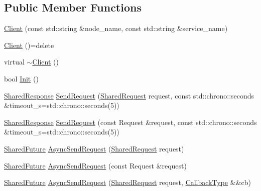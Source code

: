 \subsection*{Public Member Functions}
\begin{DoxyCompactItemize}
\item 
\hyperlink{classapollo_1_1cyber_1_1Client_a1ca1a0a5afa944750dded3726623534e}{Client} (const std\-::string \&node\-\_\-name, const std\-::string \&service\-\_\-name)
\item 
\hyperlink{classapollo_1_1cyber_1_1Client_a729e32c0d4f2dc7643f9cc5903a3166a}{Client} ()=delete
\item 
virtual \hyperlink{classapollo_1_1cyber_1_1Client_a6b08fc310fcf911beb0910da47e740d0}{$\sim$\-Client} ()
\item 
bool \hyperlink{classapollo_1_1cyber_1_1Client_af20d217d504b1e20a0d01015b4c97d74}{Init} ()
\item 
\hyperlink{classapollo_1_1cyber_1_1Client_af6198651a41ac3ed1b8c4c4bdb31bc71}{Shared\-Response} \hyperlink{classapollo_1_1cyber_1_1Client_afa9ed1738bb63776acd9478d5e922afd}{Send\-Request} (\hyperlink{classapollo_1_1cyber_1_1Client_ac30a67b1a2c1b6d37963968172c290a5}{Shared\-Request} request, const std\-::chrono\-::seconds \&timeout\-\_\-s=std\-::chrono\-::seconds(5))
\item 
\hyperlink{classapollo_1_1cyber_1_1Client_af6198651a41ac3ed1b8c4c4bdb31bc71}{Shared\-Response} \hyperlink{classapollo_1_1cyber_1_1Client_aa6ac6d852d5e216f6d794aa61df4564c}{Send\-Request} (const Request \&request, const std\-::chrono\-::seconds \&timeout\-\_\-s=std\-::chrono\-::seconds(5))
\item 
\hyperlink{classapollo_1_1cyber_1_1Client_ae8316f7e75af5319222df2dce376eebc}{Shared\-Future} \hyperlink{classapollo_1_1cyber_1_1Client_ace5807ab43406cdbfdcab251c8b20457}{Async\-Send\-Request} (\hyperlink{classapollo_1_1cyber_1_1Client_ac30a67b1a2c1b6d37963968172c290a5}{Shared\-Request} request)
\item 
\hyperlink{classapollo_1_1cyber_1_1Client_ae8316f7e75af5319222df2dce376eebc}{Shared\-Future} \hyperlink{classapollo_1_1cyber_1_1Client_a346137af09141a3bd0010bcf37098912}{Async\-Send\-Request} (const Request \&request)
\item 
\hyperlink{classapollo_1_1cyber_1_1Client_ae8316f7e75af5319222df2dce376eebc}{Shared\-Future} \hyperlink{classapollo_1_1cyber_1_1Client_aea594efa1e32a529b9428bc06cc0d5d3}{Async\-Send\-Request} (\hyperlink{classapollo_1_1cyber_1_1Client_ac30a67b1a2c1b6d37963968172c290a5}{Shared\-Request} request, \hyperlink{classapollo_1_1cyber_1_1Client_a995b86997b158bccf18e65dd077cf406}{Callback\-Type} \&\&cb)

\end{DoxyCompactItemize}
